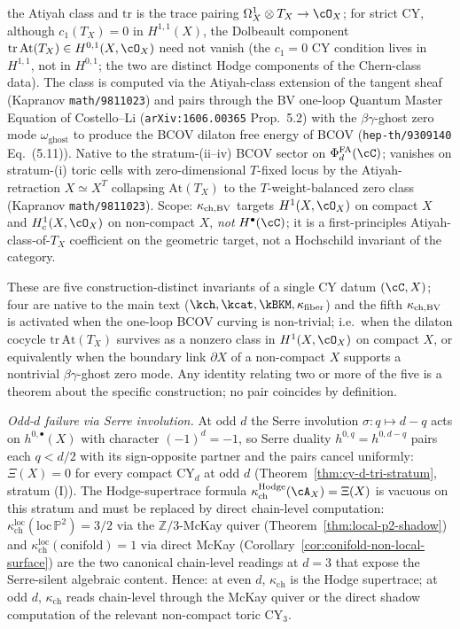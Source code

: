 \begin{definition}
\begin{enumerate}[label=\textup{(\roman*)}]
 the Atiyah class and $\mathrm{tr}$ is the trace pairing
 $\Omega^1_X \otimes T_X \to \cO_X$; for strict CY, although
 $c_1(T_X) = 0$ in $H^{1,1}(X)$, the Dolbeault component
 $\mathrm{tr}\,\mathrm{At}(T_X) \in H^{0,1}(X, \cO_X)$ need not
 vanish (the $c_1 = 0$ CY condition lives in $H^{1,1}$, not in
 $H^{0,1}$; the two are distinct Hodge components of the Chern-class
 data). The class is computed via the Atiyah-class extension of
 the tangent sheaf (Kapranov \texttt{math/9811023}) and pairs
 through the BV one-loop Quantum Master Equation of Costello--Li
 (\texttt{arXiv:1606.00365} Prop.~5.2) with the $\beta\gamma$-ghost
 zero mode $\omega_{\mathrm{ghost}}$ to produce the BCOV dilaton
 free energy of BCOV (\texttt{hep-th/9309140} Eq.~(5.11)). Native to the
 stratum-(ii--iv) BCOV sector on $\PhiFA_d(\cC)$; vanishes on
 stratum-(i) toric cells with zero-dimensional $T$-fixed locus by the
 Atiyah-retraction $X \simeq X^T$ collapsing $\mathrm{At}(T_X)$ to
 the $T$-weight-balanced zero class (Kapranov
 \texttt{math/9811023}). Scope: $\kappa_{\mathrm{ch,BV}}$ targets $H^1(X, \cO_X)$ on
 compact $X$ and $H^1_c(X, \cO_X)$ on non-compact $X$, \emph{not}
 $H^\bullet(\cC)$; it is a first-principles Atiyah-class-of-$T_X$
 coefficient on the geometric target, not a Hochschild invariant of
 the category.
\end{enumerate}
These are five construction-distinct invariants of a single CY datum
$(\cC, X)$; four are native to the main text ($\kch, \kcat, \kBKM,
\kfiber$) and the fifth $\kappa_{\mathrm{ch,BV}}$ is activated when the one-loop
BCOV curving is non-trivial; i.e.\ when the dilaton cocycle
$\mathrm{tr}\, \mathrm{At}(T_X)$ survives as a nonzero class in
$H^1(X, \cO_X)$ on compact $X$, or equivalently when the boundary
link $\partial X$ of a non-compact $X$ supports a nontrivial
$\beta\gamma$-ghost zero mode. Any identity relating two or more of
the five is a theorem about the specific construction; no pair
coincides by definition.
\end{definition}

\emph{Odd-$d$ failure via Serre involution.} At odd $d$ the Serre
involution $\sigma \colon q \mapsto d - q$ acts on $h^{0, \bullet}(X)$
with character $(-1)^d = -1$, so Serre duality $h^{0, q} = h^{0, d - q}$
pairs each $q < d/2$ with its sign-opposite partner and the pairs cancel
uniformly: $\Xi(X) = 0$ for every compact CY$_d$ at odd $d$
(Theorem~\ref{thm:cy-d-tri-stratum}, stratum (I)). The Hodge-supertrace
formula $\kappa_{\mathrm{ch}}^{\mathrm{Hodge}}(\cA_X) = \Xi(X)$ is vacuous on this
stratum and must be replaced by direct chain-level computation:
$\kappa_{\mathrm{ch}}^{\mathrm{loc}}(\mathrm{loc}\,\mathbb{P}^2) = 3/2$ via the
$\mathbb{Z}/3$-McKay quiver (Theorem~\ref{thm:local-p2-shadow}) and
$\kappa_{\mathrm{ch}}^{\mathrm{loc}}(\mathrm{conifold}) = 1$ via direct McKay
(Corollary~\ref{cor:conifold-non-local-surface}) are the two canonical
chain-level readings at $d = 3$ that expose the Serre-silent algebraic
content. Hence: at even $d$, $\kappa_{\mathrm{ch}}$ is the Hodge
supertrace; at odd $d$, $\kappa_{\mathrm{ch}}$ reads chain-level through
the McKay quiver or the direct shadow computation of the relevant
non-compact toric CY$_3$.


